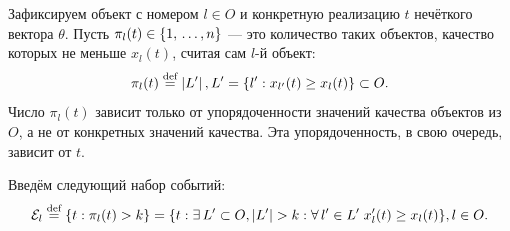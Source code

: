 Зафиксируем объект с номером $l \in O$ и конкретную реализацию  $t$ нечёткого вектора $\theta$. Пусть $\pi_l(t) \in \{1,\, \ldots, n\}$ --- это количество таких объектов, качество которых не меньше $x_l(t)$, считая сам $l$-й объект:
\begin{equation*}
  \pi_l(t) \overset{\text{def}}{=}  \left| L' \right|, L' = \{l': x_{l'}(t) \geq x_{l}(t)\}  \subset O.
\end{equation*}
 Число $\pi_l(t)$ зависит только от упорядоченности значений качества объектов из $O$, а не от конкретных значений качества. Эта упорядоченность, в свою очередь, зависит от $t$. 


Введём следующий набор событий:
\begin{equation}
  \label{e:Eps_l_def}
  \mathcal{E}_l \overset{\text{def}}{=} \{t: \pi_l(t) > k\} = \{t: \exists\, L' \subset O, \left| L' \right| > k: \forall\, l' \in L'\;x_l'(t) \geq x_{l}(t)\}, l \in O.
\end{equation}

